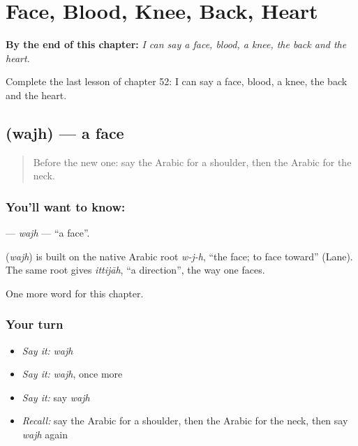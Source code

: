 
\chapter{Face, Blood, Knee, Back, Heart}
\label{ch:ar-face-blood-knee-back-heart}

\begin{chapteropening}
\textbf{By the end of this chapter:} \emph{I can say a face, blood, a knee, the back and the heart.}

Complete the last lesson of chapter 52: I can say a face, blood, a knee, the back and the heart.
\end{chapteropening}

\section[\texorpdfstring{\ar{وجه} (wajh)}{وجه (wajh)}]{ (wajh) — a face}

\label{lesson:AR-C52-wajh}



\begin{quote}
Before the new one: say the Arabic for a shoulder, then the Arabic for the neck.
\end{quote}

\subsection*{You'll want to know: }
\textbf{} — \emph{wajh} — \textquotedblleft{}a face\textquotedblright{}.

\begin{cousinweb}
\textbf{} (\emph{wajh}) is built on the native Arabic root \emph{w-j-h}, \textquotedblleft{}the face; to face toward\textquotedblright{} (Lane). The same root gives \emph{ittijāh}, \textquotedblleft{}a direction\textquotedblright{}, the way one faces.
\end{cousinweb}

\begin{grammarlens}[title={What you've built}]
One more word for this chapter.
\end{grammarlens}

\subsection*{Your turn}
\begin{itemize}
\raggedright
  \item \emph{Say it:} \emph{wajh}
  \item \emph{Say it:} \emph{wajh}, once more
  \item \emph{Say it:} say \emph{wajh}
  \item \emph{Recall:} say the Arabic for a shoulder, then the Arabic for the neck, then say \emph{wajh} again
\end{itemize}

